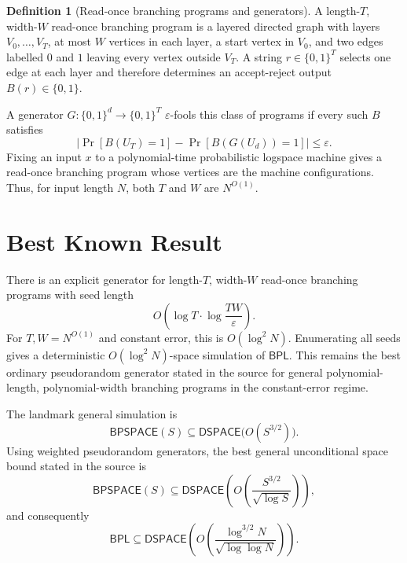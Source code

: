 \documentclass[10pt,a4paper]{article}
\theoremstyle{definition}
\newtheorem*{definition*}{Definition}
\newcommand{\BPL}{\mathsf{BPL}}
\newcommand{\BPSPACE}{\mathsf{BPSPACE}}
\newcommand{\DSPACE}{\mathsf{DSPACE}}
\begin{document}
\begin{definition*}[Read-once branching programs and generators]
A length-$T$, width-$W$ read-once branching program is a layered directed
graph with layers $V_0,\ldots,V_T$, at most $W$ vertices in each layer, a
start vertex in $V_0$, and two edges labelled $0$ and $1$ leaving every vertex
outside $V_T$. A string $r\in\{0,1\}^T$ selects one edge at each layer and
therefore determines an accept-reject output $B(r)\in\{0,1\}$.

A generator $G:\{0,1\}^d\to\{0,1\}^T$ $\varepsilon$-fools this class of
programs if every such $B$ satisfies
\begin{equation}
  \left|
    \Pr[B(U_T)=1]
    -
    \Pr[B(G(U_d))=1]
  \right|
  \leq\varepsilon.
\end{equation}
Fixing an input $x$ to a polynomial-time probabilistic logspace machine gives
a read-once branching program whose vertices are the machine configurations.
Thus, for input length $N$, both $T$ and $W$ are $N^{O(1)}$.
\end{definition*}

\newpage
\section{Best Known Result}

There is an explicit generator for length-$T$, width-$W$ read-once branching
programs with seed length
\begin{equation}
  O\left(
    \log T\cdot\log\frac{TW}{\varepsilon}
  \right).
\end{equation}
For $T,W=N^{O(1)}$ and constant error, this is $O(\log^2N)$. Enumerating all
seeds gives a deterministic $O(\log^2N)$-space simulation of $\BPL$. This
remains the best ordinary pseudorandom generator stated in the source for
general polynomial-length, polynomial-width branching programs in the
constant-error regime.

The landmark general simulation is
\begin{equation}
  \BPSPACE(S)
  \subseteq
  \DSPACE\bigl(O(S^{3/2})\bigr).
\end{equation}
Using weighted pseudorandom generators, the best general unconditional space
bound stated in the source is
\begin{equation}
  \BPSPACE(S)
  \subseteq
  \DSPACE\left(
    O\left(\frac{S^{3/2}}{\sqrt{\log S}}\right)
  \right),
\end{equation}
and consequently
\begin{equation}\label{eq:bpl-bound}
  \BPL
  \subseteq
  \DSPACE\left(
    O\left(\frac{\log^{3/2}N}{\sqrt{\log\log N}}\right)
  \right).
\end{equation}
\end{document}
